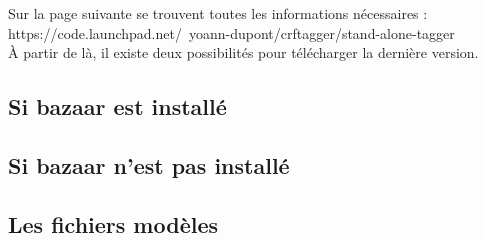 \documentclass[manual-fr.tex]{subfiles}
\begin{document}
Sur la page suivante se trouvent toutes les informations nécessaires :\\

https://code.launchpad.net/~yoann-dupont/crftagger/stand-alone-tagger \\

À partir de là, il existe deux possibilités pour télécharger la dernière version.

\subsection{Si bazaar est installé}


\subsection{Si bazaar n'est pas installé}


\subsection{\Wapiti}


\subsection{Les fichiers modèles}

\end{document}
